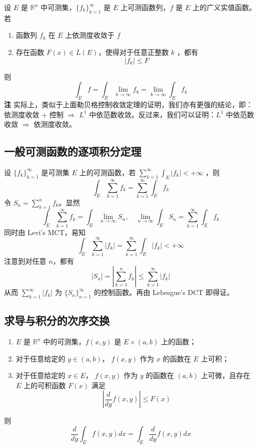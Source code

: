 \documentclass{ctexbook}
\newcommand{\no}{\noindent}
\newcommand{\pro}{\no{\bf 证明：}}
\newcommand{\R}{\mathbb{R}}
\newcommand{\ITEMS}{\begin{enumerate}[leftmargin=4em]}
\newcommand{\ITEME}{\end{enumerate}}
\begin{document}
设 $E$ 是 $\R^n$ 中可测集，$\{f_k\}_{k=1}^\infty$ 是 $E$ 上可测函数列，$f$ 是 $E$ 上的广义实值函数。若
\ITEMS
\item 函数列 $f_k$ 在 $E$ 上依测度收敛于 $f$
\item 存在函数 $F(x)\in L(E)$，使得对于任意正整数 $k$ ，都有
\[
\lvert f_k \rvert \le F
\]
\ITEME 
则
\[
\int_E f=\int_E \lim_{k\to\infty} f_k=\lim_{k\to\infty} \int_E f_k
\]
{\bf 注} 实际上，类似于上面勒贝格控制收敛定理的证明，我们亦有更强的结论，即：依测度收敛 $+$ 控制 $\Rightarrow$ $L^1$ 中依范数收敛。反过来，我们可以证明：$L^1$ 中依范数收敛 $\Rightarrow$ 依测度收敛。\\

\subsection{一般可测函数的逐项积分定理}
 设 $\{f_k\}_{k=1}^\infty$ 是可测集 $E$ 上的可测函数，若 $\sum\limits_{k=1}^\infty \int_E \lvert f_k\rvert < +\infty$ ，则
\[
	\int_E \sum\limits_{k=1}^\infty f_k = \sum\limits_{k=1}^\infty \int_E f_k 
\]
\pro
令 $S_n=\sum\limits_{k=1}^n f_k$。显然 
\[
\int_E \sum\limits_{k=1}^\infty f_k = \int_E \lim_{n \to \infty}S_n, \quad \lim_{n \to \infty}\int_E S_n=\sum\limits_{k=1}^\infty \int_E f_k 
\]
同时由 Levi's MCT，易知
\[
\int_E \sum\limits_{k=1}^\infty \lvert f_k\rvert = \sum\limits_{k=1}^\infty \int_E \lvert f_k\rvert < +\infty
\]
注意到对任意 $n$，都有
\[
\lvert S_n \rvert = \left\lvert \sum\limits_{k=1}^n f_k \right\rvert\le \sum\limits_{k=1}^\infty \lvert f_k\rvert
\]
从而 $\sum\limits_{k=1}^\infty \lvert f_k\rvert$ 为 $\{S_n\}_{n=1}^\infty$ 的控制函数。再由 Lebesgue's DCT 即得证。

\subsection{求导与积分的次序交换}

\ITEMS
	\item $E$ 是 $\R^n$ 中的可测集，$f(x,y)$ 是 $E \times (a,b)$ 上的函数；
	\item 对于任意给定的 $y \in (a,b)$， $f(x,y)$ 作为 $x$ 的函数在 $E$ 上可积；
	\item 对于任意给定的 $x \in E$， $f(x,y)$ 作为 $y$ 的函数在 $(a,b)$ 上可微，且存在 $E$ 上的可积函数 $F(x)$ 满足
	\[
		\left\lvert \frac{d}{dy} f(x,y) \right\rvert \le F(x)
	\]
\ITEME
则
\[
	\frac{d}{dy} \int_E f(x,y) dx = \int_E \frac{d}{dy} f(x,y) dx
\]

\pro 
\end{document}
